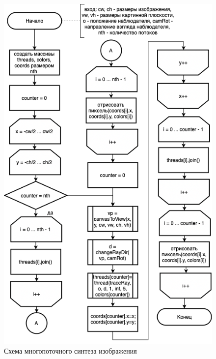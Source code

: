 \documentclass[12pt]{report}
\begin{document}
\begin{figure}[h!p]
	\centering
	\includegraphics[scale = 0.75]{multi.drawio.png}
	\caption{Схема многопоточного синтеза изображения}
	\label{fig:multi}
\end{figure}
\end{document}
